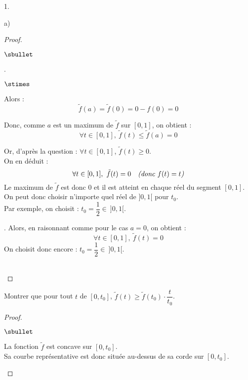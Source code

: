 \documentclass[11pt]{article}%
\begin{document}
\begin{noliste}{1.}
\begin{noliste}{a)}
\begin{proof}
\begin{noliste}{$\sbullet$}
      \item {}. 
      \begin{noliste}{$\stimes$}
      \item Alors :
      \[
        \tilde{f}(a) = \tilde{f}(0) = 0 - f(0)=0
      \]
      
      \item Donc, comme $a$ est un maximum de $\tilde{f}$ sur $[0,1]$,
      on obtient :
      \[
        \forall t\in [0,1], \ \tilde{f}(t) \leq \tilde{f}(a)=0
      \]
      
      \item Or, d'après la question  : $\forall t\in [0,1]$, 
      $\tilde{f}(t) \geq 0$.\\
      On en déduit : 
      \[
        \forall t \in [0,1], \ \tilde{f}(t) =0 \quad \text{\it (donc 
        $f(t)=t$)}
      \]
      Le maximum de $\tilde{f}$ est donc $0$ et il est atteint en 
      chaque réel du segment $[0,1]$.\\
      On peut donc choisir n'importe quel réel de $]0,1[$ pour $t_0$.\\ 
      Par exemple, on choisit : $t_0=\dfrac{1}{2} \in \ ]0,1[$.
      \end{noliste}
      
      \item {}. Alors, en raisonnant comme pour le 
      cas $a=0$, on obtient :
      \[
        \forall t \in [0,1], \ \tilde{f}(t) =0
      \]
      On choisit donc encore : $t_0=\dfrac{1}{2} \in \ ]0,1[$.
    \end{noliste}
    \conc{Ainsi, il existe toujours $t_0 \in \ ]0,1[$ tel que :
    $\tilde{f}(t_0)=\dmax{t\in [0,1]} \tilde{f}(t)$.}~\\[-1cm]
  \end{proof}

 
  \item Montrer que pour tout $t$ de $[0,t_0]$, $\tilde{f}(t) \geq 
  \tilde{f}(t_0) \cdot \dfrac{t}{t_0}$. 
  
  \begin{proof}~
    \begin{noliste}{$\sbullet$}
      \item La fonction $\tilde{f}$ est concave sur $[0,t_0]$.\\
      Sa courbe représentative est donc située au-dessus de sa corde 
      sur $[0,t_0]$.
      

\end{noliste}
\end{proof}
\end{noliste}
\end{noliste}
\end{document}
